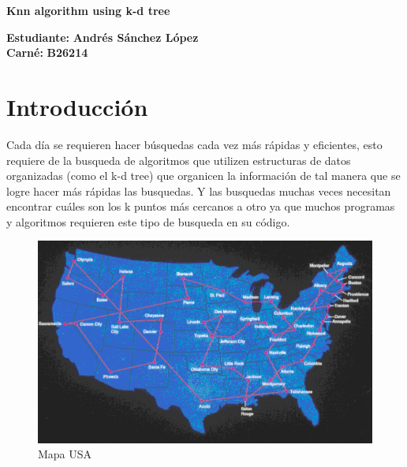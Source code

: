 \documentclass[letterpaper]{article}
\begin{document}
\vspace*{2cm}

\begin{center}
\Huge
\textbf{Knn algorithm using k-d tree}
\vspace*{1cm}
\end{center}

\noindent
\small\baselineskip=14pt
\textbf{Estudiante:} \textbf{Andrés Sánchez López}\\
\textbf{Carné:} \textbf{B26214}\\

\section{Introducción}

Cada día se requieren hacer búsquedas cada vez más rápidas y eficientes, esto requiere de la busqueda de algoritmos que utilizen estructuras de datos organizadas (como el k-d tree) que organicen la información de tal manera que se logre hacer más rápidas las busquedas. Y las busquedas muchas veces necesitan encontrar cuáles son los k puntos más cercanos a otro ya que muchos programas y algoritmos requieren este tipo de busqueda en su código.

\begin{figure}[h]
\centering
        \includegraphics[totalheight=5cm]{map.png}
    \caption{Mapa USA}
    \label{fig:verticalcell}
\end{figure}
\end{document}
